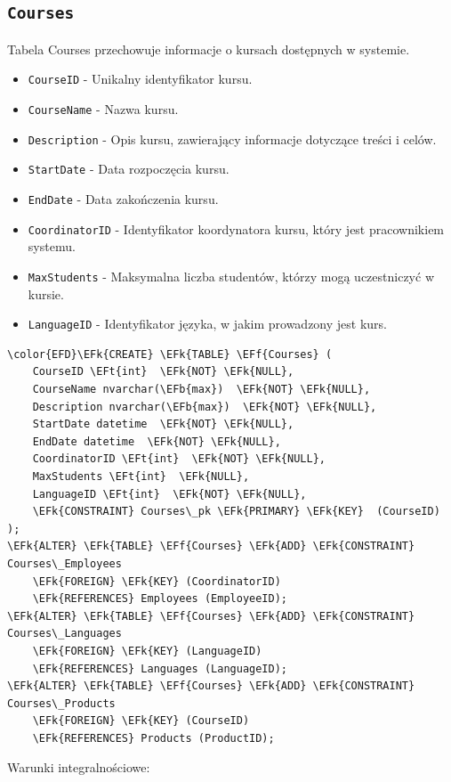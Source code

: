 \documentclass[11pt]{article}
\newcommand{\EFk}[1]{\textcolor{EFk}{\textbf{#1}}} %
\newcommand{\EFb}[1]{\textcolor{EFb}{\textbf{#1}}} %
\newcommand{\EFf}[1]{\textcolor{EFf}{#1}} %
\newcommand{\EFt}[1]{\textcolor{EFt}{\textbf{#1}}} %
\begin{document}
\subsection{\texttt{Courses}}
\label{sec:orgaa2e6e4}
Tabela Courses przechowuje informacje o kursach dostępnych w systemie.
\begin{itemize}
\item \texttt{CourseID} - Unikalny identyfikator kursu.
\item \texttt{CourseName} - Nazwa kursu.
\item \texttt{Description} - Opis kursu, zawierający informacje dotyczące treści i celów.
\item \texttt{StartDate} - Data rozpoczęcia kursu.
\item \texttt{EndDate} - Data zakończenia kursu.

\item \texttt{CoordinatorID} - Identyfikator koordynatora kursu, który jest pracownikiem systemu.
\item \texttt{MaxStudents} - Maksymalna liczba studentów, którzy mogą uczestniczyć w kursie.
\item \texttt{LanguageID} - Identyfikator języka, w jakim prowadzony jest kurs.
\end{itemize}
\begin{Code}
\begin{Verbatim}
\color{EFD}\EFk{CREATE} \EFk{TABLE} \EFf{Courses} (
    CourseID \EFt{int}  \EFk{NOT} \EFk{NULL},
    CourseName nvarchar(\EFb{max})  \EFk{NOT} \EFk{NULL},
    Description nvarchar(\EFb{max})  \EFk{NOT} \EFk{NULL},
    StartDate datetime  \EFk{NOT} \EFk{NULL},
    EndDate datetime  \EFk{NOT} \EFk{NULL},
    CoordinatorID \EFt{int}  \EFk{NOT} \EFk{NULL},
    MaxStudents \EFt{int}  \EFk{NULL},
    LanguageID \EFt{int}  \EFk{NOT} \EFk{NULL},
    \EFk{CONSTRAINT} Courses\_pk \EFk{PRIMARY} \EFk{KEY}  (CourseID)
);
\EFk{ALTER} \EFk{TABLE} \EFf{Courses} \EFk{ADD} \EFk{CONSTRAINT} Courses\_Employees
    \EFk{FOREIGN} \EFk{KEY} (CoordinatorID)
    \EFk{REFERENCES} Employees (EmployeeID);
\EFk{ALTER} \EFk{TABLE} \EFf{Courses} \EFk{ADD} \EFk{CONSTRAINT} Courses\_Languages
    \EFk{FOREIGN} \EFk{KEY} (LanguageID)
    \EFk{REFERENCES} Languages (LanguageID);
\EFk{ALTER} \EFk{TABLE} \EFf{Courses} \EFk{ADD} \EFk{CONSTRAINT} Courses\_Products
    \EFk{FOREIGN} \EFk{KEY} (CourseID)
    \EFk{REFERENCES} Products (ProductID);
\end{Verbatim}
\end{Code}
Warunki integralnościowe:
\end{document}
